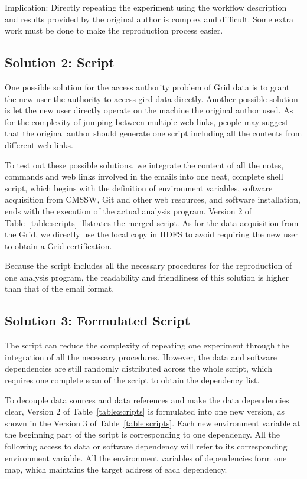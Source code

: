 \documentclass{sig-alternate}
\begin{document}
Implication: Directly repeating the experiment using the workflow description and results provided by the original author is complex and difficult. Some extra work must be done to make the reproduction process easier.

\subsection{Solution 2: Script} One possible solution for the access authority
problem of Grid data is to grant the new user the authority to access gird data
directly. Another possible solution is let the new user directly operate on the
machine the original author used. As for the complexity of jumping between
multiple web links, people may suggest that the original author
should generate one script including all the contents from different web links.

To test out these possible solutions, we integrate the content of all the notes, commands and web links involved in the emails into one neat, complete shell script, which begins with the definition of environment variables, software acquisition from CMSSW, Git and other web resources, and software installation, ends with the execution of the actual analysis program. Version 2 of Table~\ref{table:scripts} illstrates the merged script. As for the data acquisition from the Grid, we directly use the local copy in HDFS to avoid requiring the new user to obtain a Grid certification.



Because the script includes all the necessary procedures for the reproduction
of one analysis program, the readability and friendliness of this solution is
higher than that of the email format. 


\subsection{Solution 3: Formulated Script}

The script can reduce the complexity of repeating one experiment through the integration of all the necessary procedures. However, the data and software dependencies are still randomly distributed across the whole script, which requires one complete scan of the script to obtain the  dependency list. 

To decouple data sources and data references and make the data dependencies clear, Version 2 of Table~\ref{table:scripts} is formulated into one new version, as shown in
the Version 3 of Table~\ref{table:scripts}. Each new environment variable at the beginning part of
the script is corresponding to one dependency. All the following access to data
or software dependency will refer to its corresponding environment variable.
All the environment variables of dependencies form one map, which maintains the
target address of each dependency.
\end{document}

